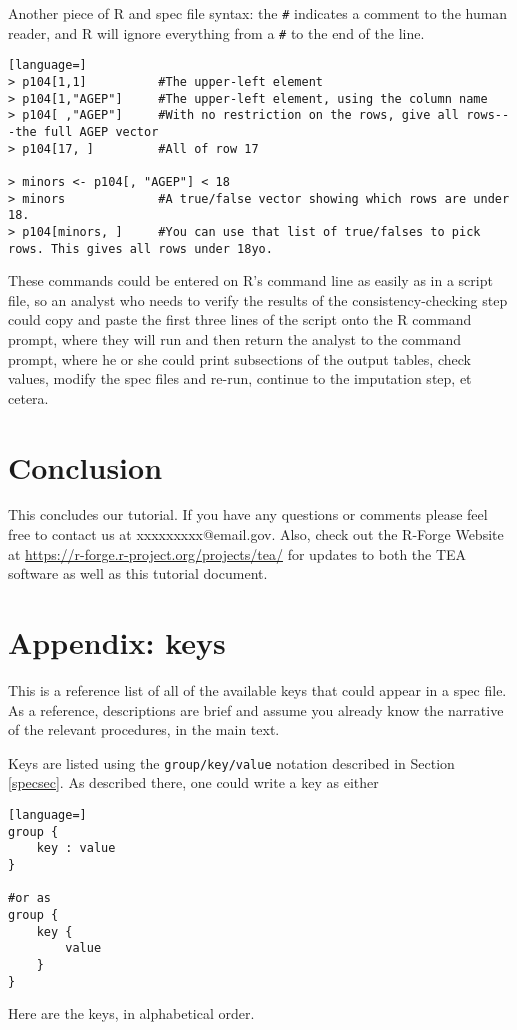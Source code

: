 \documentclass{article}
\begin{document}
Another piece of R and spec file syntax: the {\tt \#} indicates a comment to the human
reader, and R will ignore everything from a {\tt \#} to the end of the line.

\begin{lstlisting}[language=]
> p104[1,1]          #The upper-left element
> p104[1,"AGEP"]     #The upper-left element, using the column name
> p104[ ,"AGEP"]     #With no restriction on the rows, give all rows---the full AGEP vector
> p104[17, ]         #All of row 17

> minors <- p104[, "AGEP"] < 18
> minors             #A true/false vector showing which rows are under 18.
> p104[minors, ]     #You can use that list of true/falses to pick rows. This gives all rows under 18yo.
\end{lstlisting}

These commands could be entered on R's command line as easily as in a script file, so an
analyst who needs to verify the results of the consistency-checking step could copy and
paste the first three lines of the script onto the R command prompt, where they will run and
then return the analyst to the command prompt, where he or she could print subsections of
the output tables, check values, modify the spec files and re-run, continue to the
imputation step, et cetera.


\section{Conclusion}
This concludes our tutorial. If you have any questions or comments please feel free to contact 
us at xxxxxxxxx@email.gov. Also, check out the R-Forge Website at 
\url{https://r-forge.r-project.org/projects/tea/} for updates to both the TEA software as well 
as this tutorial document.

\section*{Appendix: keys}

This is a reference list of all of the available keys that could appear in a spec file.
As a reference, descriptions are brief and assume you already know the narrative of the
relevant procedures, in the main text.

Keys are listed using the {\tt group/key/value} notation described in Section \ref{specsec}. As described there, one could write a key as either
\begin{lstlisting}[language=]
group {
    key : value
}

#or as
group {
    key {
        value
    }
}
\end{lstlisting}

Here are the keys, in alphabetical order.



%
%
%
\end{document}
